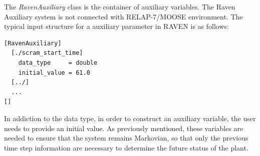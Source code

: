 \documentclass{mc2013}
\begin{document}

The \emph{RavenAuxiliary} class is the container of auxiliary variables. The Raven Auxiliary system is not connected with RELAP-7/MOOSE environment. The typical input structure for a auxiliary parameter in RAVEN is as follows:
\begin{lstlisting}
[RavenAuxiliary]
  [./scram_start_time]
    data_type     = double
    initial_value = 61.0
  [../] 
  ...
[]
\end{lstlisting}
In addiction to the data type, in order to construct an auxiliary variable, the user needs to provide an initial value.
As previously mentioned, these variables are needed to ensure that the system remains Markovian, so that only the previous time step information are necessary to determine the future status of the plant. 
\end{document}
